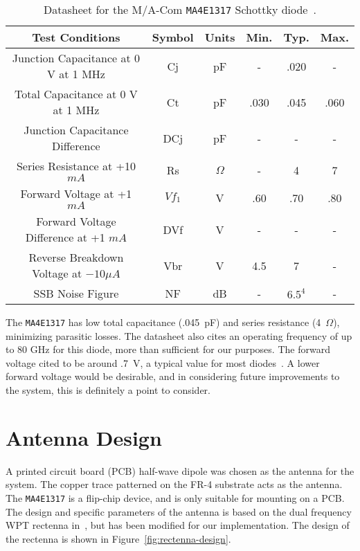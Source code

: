 \def\arraystretch{2}
\begin{table}[h]
\centering
\begin{tabular}{|c|c|c|c|c|c|}
\hline
\textbf{Test Conditions} & \textbf{Symbol} & \textbf{Units} & \textbf{Min.} & \textbf{Typ.} & \textbf{Max.} \\ \hline
Junction Capacitance at 0 V at 1 MHz & Cj & pF & - & .020 & - \\ \hline
Total Capacitance at 0 V at 1 MHz & Ct & pF & .030 & .045 & .060 \\ \hline
Junction Capacitance Difference & DCj & pF & - & - & - \\ \hline
Series Resistance at +10 $mA$ & Rs & $\Omega$ & - & 4 & 7 \\ \hline
Forward Voltage at +1 $mA$ & $Vf_1$ & V & .60 & .70 & .80 \\ \hline
Forward Voltage Difference at +1 $mA$ & DVf & V & - & - & - \\ \hline
Reverse Breakdown Voltage at $-10 \mu A$ & Vbr & V & 4.5 & 7 & - \\ \hline
SSB Noise Figure & NF & dB & - & $6.5^4$ & - \\ \hline
\end{tabular}
\caption[Datasheet for diode used in rectenna construction]{Datasheet for the M/A-Com \texttt{MA4E1317} Schottky diode~\cite{ma4e1317-datasheet}.}
\label{tab:rectenna-datasheet}
\end{table}

The \texttt{MA4E1317} has low total capacitance (.045~pF) and series resistance (4~$\Omega$), minimizing parasitic losses. The datasheet also cites an operating frequency of up to 80 GHz for this diode, more than sufficient for our purposes. The forward voltage cited to be around .7~V, a typical value for most diodes~\cite{ma4e1317-datasheet}. A lower forward voltage would be desirable, and in considering future improvements to the system, this is definitely a point to consider.

\section{Antenna Design}
\label{sec:rectenna-antenna}

A printed circuit board (PCB) half-wave dipole was chosen as the antenna for the system. The copper trace patterned on the FR-4 substrate acts as the antenna. The \texttt{MA4E1317} is a flip-chip device, and is only suitable for mounting on a PCB. The design and specific parameters of the antenna is based on the dual frequency WPT rectenna in~\cite{suh2002high}, but has been modified for our implementation. The design of the rectenna is shown in Figure~\ref{fig:rectenna-design}.


